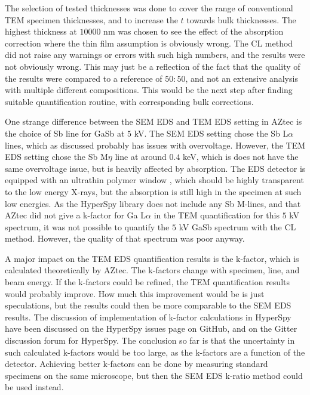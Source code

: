 The selection of tested thicknesses was done to cover the range of conventional TEM specimen thicknesses, and to increase the $t$ towards bulk thicknesses.
The highest thickness at $10000$ nm was chosen to see the effect of the absorption correction where the thin film assumption is obviously wrong.
The CL method did not raise any warnings or errors with such high numbers, and the results were not obviously wrong.
This may just be a reflection of the fact that the quality of the results were compared to a reference of $50:50$, and not an extensive analysis with multiple different compositions.
This would be the next step after finding suitable quantification routine, with corresponding bulk corrections.


One strange difference between the SEM EDS and TEM EDS setting in AZtec is the choice of Sb line for GaSb at $5$ kV.
The SEM EDS setting chose the Sb L$\alpha$ lines, which as discussed probably has issues with overvoltage.
However, the TEM EDS setting chose the Sb M$\eta$ line at around $0.4$ keV, which is does not have the same overvoltage issue, but is heavily affected by absorption.
The EDS detector is equipped with an ultrathin polymer window \cite{xmaxn_datasheet}, which should be highly transparent to the low energy X-rays, but the absorption is still high in the specimen at such low energies.
As the HyperSpy library does not include any Sb M-lines, and that AZtec did not give a k-factor for Ga L$\alpha$ in the TEM quantification for this $5$ kV spectrum, it was not possible to quantify the $5$ kV GaSb spectrum with the CL method.
However, the quality of that spectrum was poor anyway.


A major impact on the TEM EDS quantification results is the k-factor, which is calculated theoretically by AZtec.
The k-factors change with specimen, line, and beam energy.
If the k-factors could be refined, the TEM quantification results would probably improve.
How much this improvement would be is just speculations, but the results could then be more comparable to the SEM EDS results.
The discussion of implementation of k-factor calculations in HyperSpy have been discussed on the HyperSpy issues page on GitHub, and on the Gitter discussion forum for HyperSpy.
The conclusion so far is that the uncertainty in such calculated k-factors would be too large, as the k-factors are a function of the detector.
Achieving better k-factors can be done by measuring standard specimens on the same microscope, but then the SEM EDS k-ratio method could be used instead.


